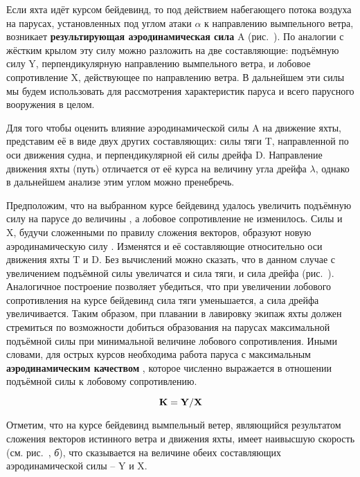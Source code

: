 Если яхта идёт курсом бейдевинд, то под действием набегающего потока
воздуха на парусах, установленных под углом атаки $\alpha$ к
направлению вымпельного ветра, возникает \textbf{результирующая
  аэродинамическая сила} \ve
A (рис.~). По
аналогии с жёстким крылом эту силу можно разложить на две
составляющие: подъёмную силу \ve Y,
перпендикулярную направлению вымпельного ветра, и лобовое
сопротивление
 \ve X, действующее по
направлению ветра. В дальнейшем эти силы мы будем использовать для
рассмотрения характеристик паруса и всего парусного вооружения в
целом.

Для того чтобы оценить влияние аэродинамической силы \ve A на движение
яхты, представим её в виде двух других составляющих: силы тяги \ve T,
направленной по оси движения судна, и перпендикулярной ей силы дрейфа
\ve D. Направление движения яхты (путь) отличается от её курса на
величину угла дрейфа $\lambda$, однако в дальнейшем анализе этим углом
можно пренебречь.

Предположим, что на выбранном курсе бейдевинд удалось увеличить
подъёмную силу на парусе до величины , а лобовое
сопротивление не изменилось. Силы  и \ve X, будучи
сложенными по правилу сложения векторов, образуют новую
аэродинамическую силу . Изменятся и её составляющие
относительно оси движения яхты \ve T и \ve D. Без вычислений можно
сказать, что в данном случае с увеличением подъёмной силы увеличатся и
сила тяги, и сила дрейфа (рис.~). Аналогичное построение
позволяет убедиться, что при увеличении лобового сопротивления на
курсе бейдевинд сила тяги уменьшается, а сила дрейфа
увеличивается. Таким образом, при плавании в лавировку экипаж яхты
должен стремиться по возможности добиться образования на парусах
максимальной подъёмной силы при минимальной величине лобового
сопротивления. Иными словами, для острых курсов необходима работа
паруса с максимальным \textbf{аэродинамическим качеством}
, которое численно
выражается в отношении подъёмной силы к лобовому сопротивлению.

\begin{equation}
\mathbf{K} = \mathbf{Y} / \mathbf{X}
\end{equation}

Отметим, что на курсе бейдевинд вымпельный ветер, являющийся
результатом сложения векторов истинного ветра и движения яхты, имеет
наивысшую скорость  (см. рис.~, \textit{б}), что
сказывается на величине обеих составляющих аэродинамической силы \---
\ve Y и \ve X.

